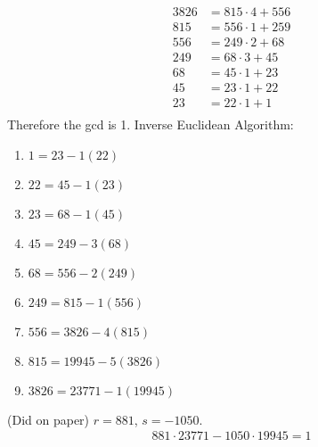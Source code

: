 \documentclass[a4paper,17pt]{extarticle}
\theoremstyle{definition}
\begin{document}
\begin{itemize}
\begin{itemize}[label=(e)]
\begin{align*}
            3826&=815\cdot4+556\\
            815&=556\cdot1+259\\
            556&=249\cdot2+68\\
            249&=68\cdot3+45\\
            68&=45\cdot1+23\\
            45&=23\cdot1+22\\
            23&=22\cdot1+1\\
        \end{align*}
        Therefore the gcd is 1. Inverse Euclidean Algorithm:\begin{enumerate}[label=\roman*.]
            \item $1=23-1(22)$
            \item $22=45-1(23)$
            \item $23=68-1(45)$
            \item $45=249-3(68)$
            \item $68=556-2(249)$
            \item $249=815-1(556)$
            \item $556=3826-4(815)$
            \item $815=19945-5(3826)$
            \item $3826=23771-1(19945)$
        \end{enumerate}
        (Did on paper) $r=881$, $s=-1050$.\begin{align*}
            881\cdot23771-1050\cdot19945=1
        \end{align*}
    \end{itemize}
\end{itemize}
\end{document}
